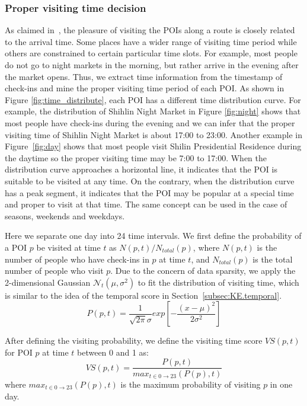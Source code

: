 \subsubsection{Proper visiting time decision} \label{sec:offline.2}
As claimed in~\cite{hsieh2012exploiting}\cite{hsieh2014mining}, the pleasure of visiting the POIs along a route is closely related to the arrival time. Some places have a wider range of visiting time period while others are constrained to certain particular time slots. For example, most people do not go to night markets in the morning, but rather arrive in the evening after the market opens. Thus, we extract time information from the timestamp of check-ins and mine the proper visiting time period of each POI. As shown in Figure \ref{fig:time_distribute}, each POI has a different time distribution curve. For example, the distribution of Shihlin Night Market in Figure \ref{fig:night} shows that most people have check-ins during the evening and we can infer that the proper visiting time of Shihlin Night Market is about 17:00 to 23:00. Another example in Figure~\ref{fig:day} shows that most people visit Shilin Presidential Residence during the daytime so the proper visiting time may be 7:00 to 17:00. When the distribution curve approaches a horizontal line, it indicates that the POI is suitable to be visited at any time. On the contrary, when the distribution curve has a peak segment, it indicates that the POI may be popular at a special time and proper to visit at that time. The same concept can be used in the case of seasons, weekends and weekdays.

Here we separate one day into 24 time intervals. We first define the probability of a POI $p$ be visited at time $t$ as ${N(p,t)}/N_{total}(p)$, where ${N(p,t)}$ is the number of people who have check-ins in $p$ at time $t$, and $N_{total}(p)$ is the total number of people who visit $p$. Due to the concern of data sparsity, we apply the 2-dimensional Gaussian $\mathcal{N}_t(\mu,\sigma^2)$ to fit the distribution of visiting time, which is similar to the idea of the temporal score in Section~\ref{subsec:KE.temporal}.
\begin{equation}
P(p,t)=\frac {1}{\sqrt{2\pi}\sigma} exp\left[ -\frac { { \left( x-\mu  \right)  }^{ 2 } }{ 2{ \sigma }^{ 2 } }  \right] 
\end{equation}

After defining the visiting probability, we define the visiting time score $VS(p,t)$ for POI $p$ at time $t$ between 0 and 1 as:
\begin{equation}
VS(p,t)=\frac{P(p,t)}{max_{t\in{0{\rightarrow}23}}(P(p),t)}
\end{equation}
where $max_{t\in{0{\rightarrow}23}}(P(p),t)$ is the maximum probability of visiting $p$ in one day.


